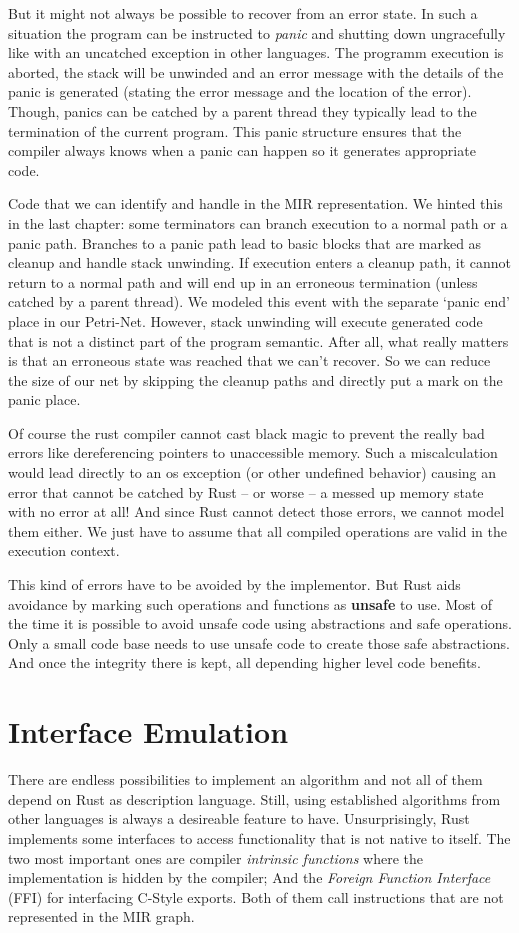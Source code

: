 But it might not always be possible to recover from an error state.
In such a situation the program can be instructed to \textit{panic} and shutting down ungracefully like with an uncatched exception in other languages.
The programm execution is aborted, the stack will be unwinded and an error message with the details of the panic is generated (stating the error message and the location of the error).
Though, panics can be catched by a parent thread they typically lead to the termination of the current program.
This panic structure ensures that the compiler always knows when a panic can happen so it generates appropriate code.

Code that we can identify and handle in the MIR representation.
We hinted this in the last chapter: some terminators can branch execution to a normal path or a panic path.
Branches to a panic path lead to basic blocks that are marked as cleanup and handle stack unwinding.
If execution enters a cleanup path, it cannot return to a normal path and will end up in an erroneous termination (unless catched by a parent thread).
We modeled this event with the separate `panic end' place in our Petri-Net.
However, stack unwinding will execute generated code that is not a distinct part of the program semantic.
After all, what really matters is that an erroneous state was reached that we can't recover.
So we can reduce the size of our net by skipping the cleanup paths and directly put a mark on the panic place.

Of course the rust compiler cannot cast black magic to prevent the really bad errors like dereferencing pointers to unaccessible memory.
Such a miscalculation would lead directly to an os exception (or other undefined behavior) causing an error that cannot be catched by Rust -- or worse -- a messed up memory state with no error at all!
And since Rust cannot detect those errors, we cannot model them either.
We just have to assume that all compiled operations are valid in the execution context.

This kind of errors have to be avoided by the implementor.
But Rust aids avoidance by marking such operations and functions as \textbf{unsafe} to use.
Most of the time it is possible to avoid unsafe code using abstractions and safe operations.
Only a small code base needs to use unsafe code to create those safe abstractions. 
And once the integrity there is kept, all depending higher level code benefits.

\section{Interface Emulation}
\label{emulation}
There are endless possibilities to implement an algorithm and not all of them depend on Rust as description language.
Still, using established algorithms from other languages is always a desireable feature to have.
Unsurprisingly, Rust implements some interfaces to access functionality that is not native to itself.
The two most important ones are compiler \textit{intrinsic functions} where the implementation is hidden by the compiler;
And the \textit{Foreign Function Interface} (FFI) for interfacing C-Style exports.
Both of them call instructions that are not represented in the MIR graph.

